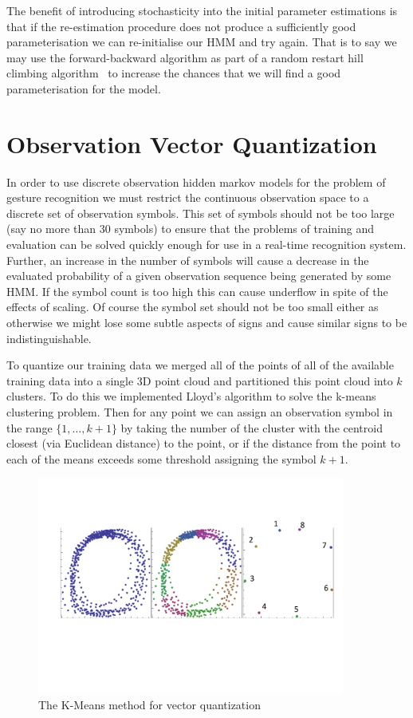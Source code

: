 The benefit of introducing stochasticity into the initial parameter estimations is that if the re-estimation procedure does not produce a sufficiently good parameterisation we can re-initialise our HMM and try again. That is to say we may use the forward-backward algorithm as part of a random restart hill climbing algorithm~\citep{russell1995artificial} to increase the chances that we will find a good parameterisation for the model.

\section{Observation Vector Quantization}
In order to use discrete observation hidden markov models for the problem of gesture recognition we must restrict the continuous observation space to a discrete set of observation symbols. This set of symbols should not be too large (say no more than 30 symbols) to ensure that the problems of training and evaluation can be solved quickly enough for use in a real-time recognition system. Further, an increase in the number of symbols will cause a decrease in the evaluated probability of a given observation sequence being generated by some HMM. If the symbol count is too high this can cause underflow in spite of the effects of scaling. Of course the symbol set should not be too small either as otherwise we might lose some subtle aspects of signs and cause similar signs to be indistinguishable.

To quantize our training data we merged all of the points of all of the available training data into a single 3D point cloud and partitioned this point cloud into $k$ clusters. To do this we implemented Lloyd's algorithm to solve the k-means clustering problem. Then for any point we can assign an observation symbol in the range $\{1,\dots,k+1\}$ by taking the number of the cluster with the centroid closest (via Euclidean distance) to the point, or if the distance from the point to each of the means exceeds some threshold assigning the symbol $k+1$. 

\begin{figure}[h!]
        \centering
        \includegraphics[width=0.9\textwidth]{ThesisFigs/ClusteringDiag}
        \caption{The K-Means method for vector quantization}\label{fig:kmeans}
\end{figure}

